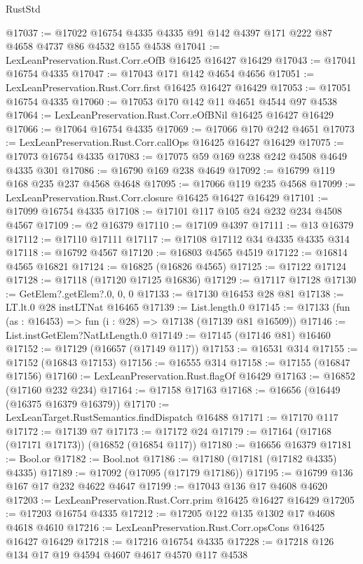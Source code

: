 \begin{lexlean}{RustStd}
\begin{coremodule}
{\begin{coremodule}
{{{{{{{{{{{{{{{{{{{{{{{{{{{{{{{{{{{{{{{{{{{{{{{{{{{{{{{@17037 := @17022 @16754 @4335 @4335 @91 @142 @4397 @171 @222 @87 @4658 @4737 @86 @4532 @155 @4538
@17041 := LexLeanPreservation.Rust.Corr.eOfB @16425 @16427 @16429
@17043 := @17041 @16754 @4335
@17047 := @17043 @171 @142 @4654 @4656
@17051 := LexLeanPreservation.Rust.Corr.first @16425 @16427 @16429
@17053 := @17051 @16754 @4335
@17060 := @17053 @170 @142 @11 @4651 @4544 @97 @4538
@17064 := LexLeanPreservation.Rust.Corr.eOfBNil @16425 @16427 @16429
@17066 := @17064 @16754 @4335
@17069 := @17066 @170 @242 @4651
@17073 := LexLeanPreservation.Rust.Corr.callOps @16425 @16427 @16429
@17075 := @17073 @16754 @4335
@17083 := @17075 @59 @169 @238 @242 @4508 @4649 @4335 @301
@17086 := @16790 @169 @238 @4649
@17092 := @16799 @119 @168 @235 @237 @4568 @4648
@17095 := @17066 @119 @235 @4568
@17099 := LexLeanPreservation.Rust.Corr.closure @16425 @16427 @16429
@17101 := @17099 @16754 @4335
@17108 := @17101 @117 @105 @24 @232 @234 @4508 @4567
@17109 := @2 @16379
@17110 := @17109 @4397
@17111 := @13 @16379
@17112 := @17110 @17111
@17117 := @17108 @17112 @34 @4335 @4335 @314
@17118 := @16792 @4567
@17120 := @16803 @4565 @4519
@17122 := @16814 @4565 @16821
@17124 := @16825 (@16826 @4565)
@17125 := @17122 @17124
@17128 := @17118 (@17120 @17125 @16836)
@17129 := @17117 @17128
@17130 := GetElem?.getElem?.{0, 0, 0}
@17133 := @17130 @16453 @28 @81
@17138 := LT.lt.{0} @28 instLTNat @16465
@17139 := List.length.{0}
@17145 := @17133 (fun (as : @16453) => fun (i : @28) => @17138 (@17139 @81 @16509))
@17146 := List.instGetElem?NatLtLength.{0}
@17149 := @17145 (@17146 @81) @16460
@17152 := @17129 (@16657 (@17149 @117))
@17153 := @16531 @314
@17155 := @17152 (@16843 @17153)
@17156 := @16555 @314
@17158 := @17155 (@16847 @17156)
@17160 := LexLeanPreservation.Rust.flagOf @16429
@17163 := @16852 (@17160 @232 @234)
@17164 := @17158 @17163
@17168 := @16656 (@16449 (@16375 @16379 @16379))
@17170 := LexLeanTarget.RustSemantics.findDispatch @16488
@17171 := @17170 @117
@17172 := @17139 @7
@17173 := @17172 @24
@17179 := @17164 (@17168 (@17171 @17173)) (@16852 (@16854 @117))
@17180 := @16656 @16379
@17181 := Bool.or
@17182 := Bool.not
@17186 := @17180 (@17181 (@17182 @4335) @4335)
@17189 := @17092 (@17095 (@17179 @17186))
@17195 := @16799 @136 @167 @17 @232 @4622 @4647
@17199 := @17043 @136 @17 @4608 @4620
@17203 := LexLeanPreservation.Rust.Corr.prim @16425 @16427 @16429
@17205 := @17203 @16754 @4335
@17212 := @17205 @122 @135 @1302 @17 @4608 @4618 @4610
@17216 := LexLeanPreservation.Rust.Corr.opsCons @16425 @16427 @16429
@17218 := @17216 @16754 @4335
@17228 := @17218 @126 @134 @17 @19 @4594 @4607 @4617 @4570 @117 @4538
}}}}}}}}}}}}}}}}}}}}}}}}}}}}}}}}}}}}}}}}}}}}}}}}}}}}}}}
\end{coremodule}}
\end{coremodule}
\end{lexlean}

